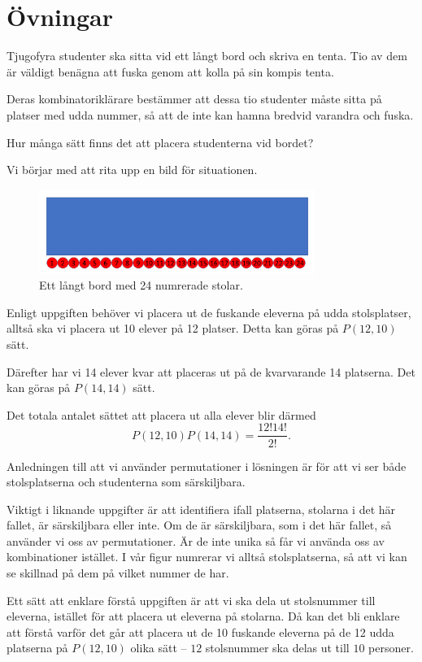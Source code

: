 \documentclass{tufte-handout}
\begin{document}
\section{Övningar}

\begin{xca}
	Tjugofyra studenter ska sitta vid ett långt bord och skriva en tenta. Tio av dem är väldigt benägna att fuska genom att kolla på sin kompis tenta.

	Deras kombinatoriklärare bestämmer att dessa tio studenter måste sitta på platser med udda nummer, så att de inte kan hamna bredvid varandra och fuska.

	Hur många sätt finns det att placera studenterna vid bordet?
\end{xca}

\begin{solution}
	Vi börjar med att rita upp en bild för situationen.
	\begin{figure}
		\centering
		\includegraphics[width=0.8\textwidth]{bordmedstolar.png}
		\caption{Ett långt bord med 24 numrerade stolar.}
	\end{figure}

    Enligt uppgiften behöver vi placera ut de fuskande eleverna på udda stolsplatser, alltså ska vi placera ut 10 elever på 12 platser. Detta kan göras på $P(12,10)$ sätt.
	
	Därefter har vi 14 elever kvar att placeras ut på de kvarvarande 14 platserna. Det kan göras på $P(14,14)$ sätt. 
	
	Det totala antalet sättet att placera ut alla elever blir därmed
    $$P(12,10) P(14,14)=\frac{12! 14!}{2!}.$$

    Anledningen till att vi använder permutationer i lösningen är för att vi ser både stolsplatserna och studenterna som särskiljbara.

    \begin{tips}
		Viktigt i liknande uppgifter är att identifiera ifall platserna, stolarna i det här fallet, är särskiljbara eller inte. Om de är särskiljbara, som i det här fallet, så använder vi oss av permutationer. Är de inte unika så får vi använda oss av kombinationer istället. I vår figur numrerar vi alltså stolsplatserna, så att vi kan se skillnad på dem på vilket nummer de har.

    	Ett sätt att enklare förstå uppgiften är att vi ska dela ut stolsnummer till eleverna, istället för att placera ut eleverna på stolarna. Då kan det bli enklare att förstå varför det går att placera ut de 10 fuskande eleverna på de 12 udda platserna på $P(12,10)$ olika sätt -- $12$ stolsnummer ska delas ut till $10$ personer.
	\end{tips}
\end{solution}
\end{document}
